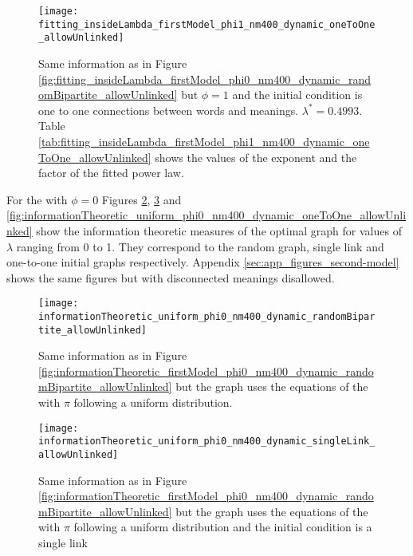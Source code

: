 \begin{figure}
  \centering
  \texttt{[image: fitting\_insideLambda\_firstModel\_phi1\_nm400\_dynamic\_oneToOne\_allowUnlinked]}
  \caption{Same information as in Figure \ref{fig:fitting_insideLambda_firstModel_phi0_nm400_dynamic_randomBipartite_allowUnlinked} but $\phi=1$ and the initial condition is one to one connections between words and meanings. $\lambda^*=0.4993$.
Table \ref{tab:fitting_insideLambda_firstModel_phi1_nm400_dynamic_oneToOne_allowUnlinked} shows the values of the exponent and the factor of the fitted power law.}
  \label{fig:fitting_insideLambda_firstModel_phi1_nm400_dynamic_oneToOne_allowUnlinked}
\end{figure}





For the \secondmodel{} with $\phi=0$ Figures  \ref{fig:informationTheoretic_uniform_phi0_nm400_dynamic_randomBipartite_allowUnlinked},  \ref{fig:informationTheoretic_uniform_phi0_nm400_dynamic_singleLink_allowUnlinked} and  \ref{fig:informationTheoretic_uniform_phi0_nm400_dynamic_oneToOne_allowUnlinked} show the information theoretic measures of the optimal graph for values of $\lambda$ ranging from 0 to 1.
They correspond to the random graph, single link and one-to-one initial graphs respectively.
Appendix \ref{sec:app_figures_second-model} shows the same figures but with disconnected meanings disallowed.

\begin{figure}
  \centering
  \texttt{[image: informationTheoretic\_uniform\_phi0\_nm400\_dynamic\_randomBipartite\_allowUnlinked]}
  \caption{Same information as in Figure \ref{fig:informationTheoretic_firstModel_phi0_nm400_dynamic_randomBipartite_allowUnlinked} but the graph uses the equations of the \secondmodel{} with $\pi$ following a uniform distribution.}
  \label{fig:informationTheoretic_uniform_phi0_nm400_dynamic_randomBipartite_allowUnlinked}
\end{figure}

\begin{figure}
  \centering
  \texttt{[image: informationTheoretic\_uniform\_phi0\_nm400\_dynamic\_singleLink\_allowUnlinked]}
  \caption{Same information as in Figure \ref{fig:informationTheoretic_firstModel_phi0_nm400_dynamic_randomBipartite_allowUnlinked} but the graph uses the equations of the \secondmodel{} with $\pi$ following a uniform distribution and the initial condition is a single link}
  \label{fig:informationTheoretic_uniform_phi0_nm400_dynamic_singleLink_allowUnlinked}
\end{figure}

